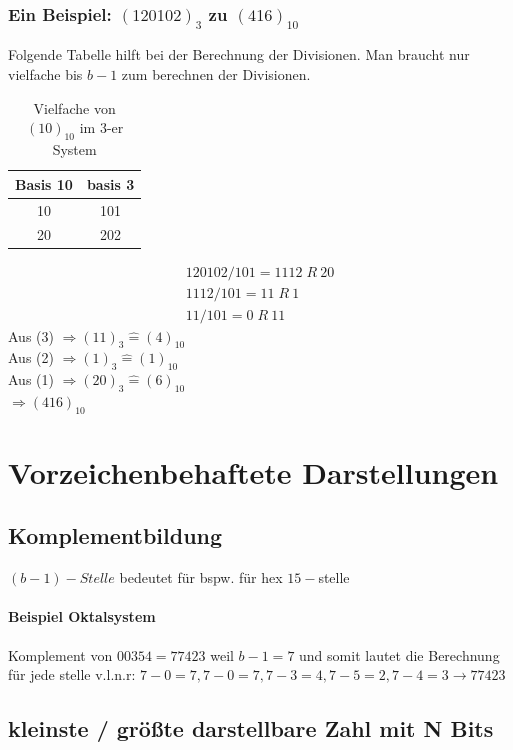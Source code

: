 \documentclass[a4paper]{article}
\newcommand{\entspricht}{\mathrel{\widehat{=}}}
\begin{document}
		\subsubsection{\texorpdfstring{Ein Beispiel: $(120102)_3$ zu $(416)_{10}$}{Ein Beispiel: 120102 Basis 3 zu Dezimal 416}}
			Folgende Tabelle hilft bei der Berechnung der Divisionen. Man braucht nur vielfache bis $b-1$ zum berechnen der Divisionen.
			\begin{table}[H]
			\centering
			\caption{Vielfache von $(10)_{10}$ im 3-er System}
			\label{vielfacheVon10in3}
			\begin{tabular}{c|c}
			Basis 10 & basis 3 \\\hline
			10       & 101     \\\hline
			20       & 202
			\end{tabular}
			\end{table}
			\begin{eqnarray}
			120102 / 101 =  1112\;R\:20 \\
			1112 / 101 = 11\;R\:1 \\
			11 / 101 = 0\;R\:11
			\end{eqnarray}
			Aus (3) $ \Rightarrow  (11)_3 \entspricht (4)_{10} $ \\
			Aus (2) $ \Rightarrow  (1)_3 \entspricht (1)_{10} $ \\
			Aus (1) $ \Rightarrow  (20)_3 \entspricht (6)_{10} $ \\
			
			$ \Rightarrow (416)_{10} $

\section{Vorzeichenbehaftete Darstellungen}
	\subsection{Komplementbildung}
			$(b-1) - Stelle$ bedeutet für bspw. für hex $15-$stelle
		\paragraph{Beispiel Oktalsystem}
			Komplement von $00354 = 77423$ weil $b-1 = 7$ und somit lautet die Berechnung für jede stelle v.l.n.r: $7-0=7, 7-0=7,7-3=4,7-5=2,7-4=3 \rightarrow 77423$
	\subsection{kleinste / größte darstellbare Zahl mit N Bits}
\end{document}
